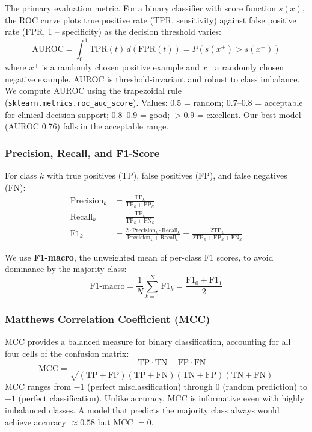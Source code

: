 The primary evaluation metric. For a binary classifier with score function $s(x)$, the ROC curve plots true positive rate (TPR, sensitivity) against false positive rate (FPR, 1 -- specificity) as the decision threshold varies:
\begin{equation}
\text{AUROC} = \int_0^1 \text{TPR}(t) \, d(\text{FPR}(t)) = P(s(x^+) > s(x^-))
\end{equation}
where $x^+$ is a randomly chosen positive example and $x^-$ a randomly chosen negative example. AUROC is threshold-invariant and robust to class imbalance. We compute AUROC using the trapezoidal rule (\texttt{sklearn.metrics.roc\_auc\_score}). Values: 0.5 = random; 0.7--0.8 = acceptable for clinical decision support; 0.8--0.9 = good; $>$0.9 = excellent. Our best model (AUROC 0.76) falls in the acceptable range.

\subsubsection{Precision, Recall, and F1-Score}

For class $k$ with true positives (TP), false positives (FP), and false negatives (FN):
\begin{align}
\text{Precision}_k &= \frac{\text{TP}_k}{\text{TP}_k + \text{FP}_k} \\
\text{Recall}_k &= \frac{\text{TP}_k}{\text{TP}_k + \text{FN}_k} \\
\text{F1}_k &= \frac{2 \cdot \text{Precision}_k \cdot \text{Recall}_k}{\text{Precision}_k + \text{Recall}_k} = \frac{2\text{TP}_k}{2\text{TP}_k + \text{FP}_k + \text{FN}_k}
\end{align}

We use \textbf{F1-macro}, the unweighted mean of per-class F1 scores, to avoid dominance by the majority class:
\begin{equation}
\text{F1-macro} = \frac{1}{N} \sum_{k=1}^{N} \text{F1}_k = \frac{\text{F1}_0 + \text{F1}_1}{2}
\end{equation}

\subsubsection{Matthews Correlation Coefficient (MCC)}

MCC provides a balanced measure for binary classification, accounting for all four cells of the confusion matrix:
\begin{equation}
\text{MCC} = \frac{\text{TP} \cdot \text{TN} - \text{FP} \cdot \text{FN}}{\sqrt{(\text{TP}+\text{FP})(\text{TP}+\text{FN})(\text{TN}+\text{FP})(\text{TN}+\text{FN})}}
\end{equation}
MCC ranges from $-1$ (perfect misclassification) through $0$ (random prediction) to $+1$ (perfect classification). Unlike accuracy, MCC is informative even with highly imbalanced classes. A model that predicts the majority class always would achieve accuracy $\approx 0.58$ but MCC $= 0$.

